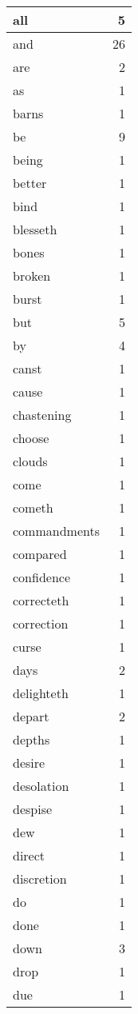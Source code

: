 \begin{center}
\begin{longtable}{l|r}
all & 5\\ \hline 
and & 26\\ \hline 
are & 2\\ \hline 
as & 1\\ \hline 
barns & 1\\ \hline 
be & 9\\ \hline 
being & 1\\ \hline 
better & 1\\ \hline 
bind & 1\\ \hline 
blesseth & 1\\ \hline 
bones & 1\\ \hline 
broken & 1\\ \hline 
burst & 1\\ \hline 
but & 5\\ \hline 
by & 4\\ \hline 
canst & 1\\ \hline 
cause & 1\\ \hline 
chastening & 1\\ \hline 
choose & 1\\ \hline 
clouds & 1\\ \hline 
come & 1\\ \hline 
cometh & 1\\ \hline 
commandments & 1\\ \hline 
compared & 1\\ \hline 
confidence & 1\\ \hline 
correcteth & 1\\ \hline 
correction & 1\\ \hline 
curse & 1\\ \hline 
days & 2\\ \hline 
delighteth & 1\\ \hline 
depart & 2\\ \hline 
depths & 1\\ \hline 
desire & 1\\ \hline 
desolation & 1\\ \hline 
despise & 1\\ \hline 
dew & 1\\ \hline 
direct & 1\\ \hline 
discretion & 1\\ \hline 
do & 1\\ \hline 
done & 1\\ \hline 
down & 3\\ \hline 
drop & 1\\ \hline 
due & 1\\ \hline 

\end{longtable}
\end{center}
